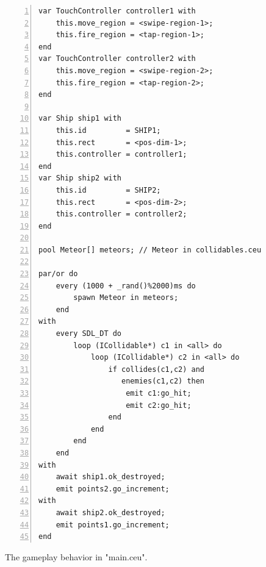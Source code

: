 \documentclass{sigplanconf}
\newcommand{\1}{\;}
\newcommand{\2}{\;\;}
\newcommand{\3}{\;\;\;}
\newcommand{\5}{\;\;\;\;\;}
\begin{document}
\begin{figure}%
\begin{lstlisting}[numbers=left,xleftmargin=3em]
var TouchController controller1 with
    this.move_region = <swipe-region-1>;
    this.fire_region = <tap-region-1>;
end
var TouchController controller2 with
    this.move_region = <swipe-region-2>;
    this.fire_region = <tap-region-2>;
end

var Ship ship1 with
    this.id         = SHIP1;
    this.rect       = <pos-dim-1>;
    this.controller = controller1;
end
var Ship ship2 with
    this.id         = SHIP2;
    this.rect       = <pos-dim-2>;
    this.controller = controller2;
end

pool Meteor[] meteors; // Meteor in collidables.ceu

par/or do
    every (1000 + _rand()%2000)ms do
        spawn Meteor in meteors;
    end
with
    every SDL_DT do
        loop (ICollidable*) c1 in <all> do
            loop (ICollidable*) c2 in <all> do
                if collides(c1,c2) and
                   enemies(c1,c2) then
                    emit c1:go_hit;
                    emit c2:go_hit;
                end
            end
        end
    end
with
    await ship1.ok_destroyed;
    emit points2.go_increment;
with
    await ship2.ok_destroyed;
    emit points1.go_increment;
end
\end{lstlisting}
\caption{ The gameplay behavior in "main.ceu".
\label{lst.apps.rocks.3}
}
\end{figure}
\end{document}
